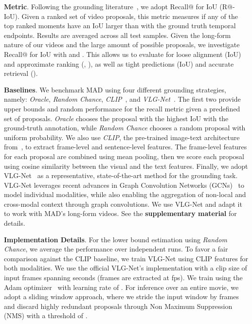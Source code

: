 \documentclass[10pt,twocolumn,letterpaper]{article}
\renewcommand{\paragraph}[1]{\vspace{1mm}\noindent\textbf{#1}.}
\begin{document}
\paragraph{Metric}
Following the grounding literature~\cite{Gao_2017_ICCV,Hendricks_2017_ICCV}, we adopt Recall@ for IoU (R@-IoU). Given a ranked set of video proposals, this metric measures if any of the top  ranked moments have an IoU larger than  with the ground truth temporal endpoints. Results are averaged across all test samples. Given the long-form nature of our videos and the large amount of possible proposals, we investigate Recall@ for IoU with  and . 
This allows us to evaluate for loose alignment (\ie IoU) and approximate ranking (\ie, ), as well as tight predictions (\ie IoU) and accurate retrieval (\ie ). 

\paragraph{Baselines}
We benchmark MAD using four different grounding strategies, namely: \textit{Oracle}, \textit{Random Chance}, \textit{CLIP}~\cite{radford2021learning}, and \textit{VLG-Net}~\cite{soldan2021vlg}. The first two provide upper bounds and random performance for the recall metric given a predefined set of proposals. \textit{Oracle} chooses the proposal with the highest IoU with the ground-truth annotation, while \textit{Random Chance} chooses a random proposal with uniform probability. We also use \textit{CLIP}, the pre-trained image-text architecture from~\cite{radford2021learning}, to extract frame-level and sentence-level features. The frame-level features for each proposal are combined using mean pooling, then we score each proposal using cosine similarity between the visual and the text features. Finally, we adopt VLG-Net~\cite{soldan2021vlg} as a representative, state-of-the-art method for the  grounding task. VLG-Net leverages recent advances in Graph Convolution Networks (GCNs)~\cite{li2019deepgcns,xu2020gtad,li2021deepgcns_pami,li2020deepergcn,zhao2021video} to model individual modalities, while also enabling the aggregation of non-local and cross-modal context through graph convolutions. We use VLG-Net and adapt it to work with MAD's long-form videos. See the \textbf{supplementary material} for details. 

\paragraph{Implementation Details}
For the lower bound estimation using \textit{Random Chance}, we average the performance over  independent runs. 
To favor a fair comparison against the CLIP baseline, we train VLG-Net using CLIP features for both modalities. We use the official VLG-Net's implementation with a clip size of  input frames spanning  seconds (frames are extracted at  fps). We train using the Adam optimizer~\cite{kingma2014adam} with learning rate of . For inference over an entire movie, we adopt a sliding window approach, where we stride the input window by  frames and discard highly redundant proposals through Non Maximum Suppression (NMS) with a threshold of .
\end{document}
